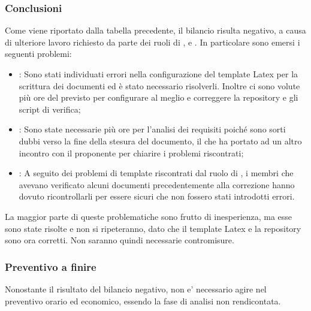 \subsubsection{Conclusioni}
Come viene riportato dalla tabella precedente, il bilancio risulta negativo, a causa di ulteriore lavoro richiesto da parte dei ruoli di \ammProg{}, \analProg{} e \verifProg{}. In particolare sono emersi i seguenti problemi:
\begin{itemize}
\item \textbf{\ammProg{}}: Sono stati individuati errori nella configurazione del template Latex per la scrittura dei documenti ed è stato necessario risolverli. Inoltre ci sono volute più ore del previsto per configurare al meglio e correggere la repository e gli script di verifica;
\item \textbf{\analProg{}}: Sono state necessarie più ore per l'analisi dei requisiti poiché sono sorti dubbi verso la fine della stesura del documento, il che ha portato ad un altro incontro con il proponente per chiarire i problemi riscontrati;
\item \textbf{\verifProg{}}: A seguito dei problemi di template riscontrati dal ruolo di \ammProg{}, i membri che avevano verificato alcuni documenti precedentemente alla correzione hanno dovuto ricontrollarli per essere sicuri che non fossero stati introdotti errori.
\end{itemize}

La maggior parte di queste problematiche sono frutto di inesperienza, ma esse sono state risolte e non si ripeteranno, dato che il template Latex e la repository sono ora corretti. Non saranno quindi necessarie contromisure.

\subsubsection{Preventivo a finire}
Nonostante il risultato del bilancio negativo, non e' necessario agire nel preventivo orario ed economico, essendo la fase di analisi non rendicontata.

